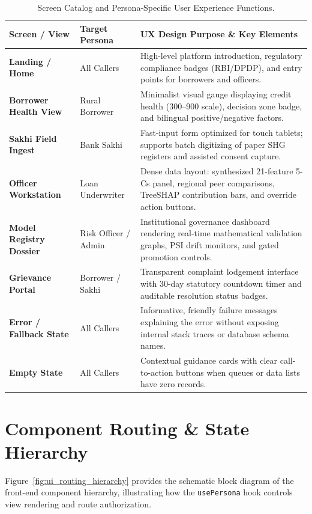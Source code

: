 \documentclass[11pt,a4paper,oneside]{report}
\begin{document}
\begin{table}[H]
\centering
\small
\renewcommand{\arraystretch}{1.2}
\begin{tabularx}{\textwidth}{p{3.0cm} p{3.2cm} X}
  \toprule
  \textbf{Screen / View} & \textbf{Target Persona} & \textbf{UX Design Purpose \& Key Elements} \\
  \midrule
  \textbf{Landing / Home} & All Callers & High-level platform introduction, regulatory compliance badges (RBI/DPDP), and entry points for borrowers and officers. \\
  \addlinespace
  \textbf{Borrower Health View} & Rural Borrower & Minimalist visual gauge displaying credit health (300--900 scale), decision zone badge, and bilingual positive/negative factors. \\
  \addlinespace
  \textbf{Sakhi Field Ingest} & Bank Sakhi & Fast-input form optimized for touch tablets; supports batch digitizing of paper SHG registers and assisted consent capture. \\
  \addlinespace
  \textbf{Officer Workstation} & Loan Underwriter & Dense data layout: synthesized 21-feature 5-Cs panel, regional peer comparisons, TreeSHAP contribution bars, and override action buttons. \\
  \addlinespace
  \textbf{Model Registry Dossier} & Risk Officer / Admin & Institutional governance dashboard rendering real-time mathematical validation graphs, PSI drift monitors, and gated promotion controls. \\
  \addlinespace
  \textbf{Grievance Portal} & Borrower / Sakhi & Transparent complaint lodgement interface with 30-day statutory countdown timer and auditable resolution status badges. \\
  \addlinespace
  \textbf{Error / Fallback State} & All Callers & Informative, friendly failure messages explaining the error without exposing internal stack traces or database schema names. \\
  \addlinespace
  \textbf{Empty State} & All Callers & Contextual guidance cards with clear call-to-action buttons when queues or data lists have zero records. \\
  \bottomrule
\end{tabularx}
\caption{Screen Catalog and Persona-Specific User Experience Functions.}
\label{tab:screen_catalog}
\end{table}

\section{Component Routing & State Hierarchy}
Figure~\ref{fig:ui_routing_hierarchy} provides the schematic block diagram of the front-end component hierarchy, illustrating how the \texttt{usePersona} hook controls view rendering and route authorization.
\end{document}
